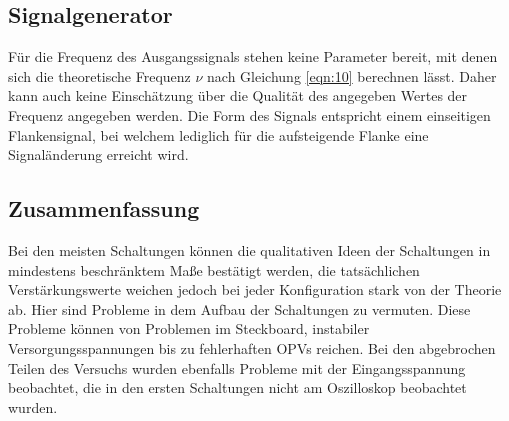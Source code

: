 \subsection{Signalgenerator}
Für die Frequenz des Ausgangssignals stehen keine Parameter bereit, mit denen sich die
theoretische Frequenz $\nu$ nach Gleichung \ref{eqn:10} berechnen lässt. Daher
kann auch keine Einschätzung über die Qualität des angegeben Wertes der Frequenz
angegeben werden. Die Form des Signals entspricht einem einseitigen Flankensignal,
bei welchem lediglich für die aufsteigende Flanke eine Signaländerung erreicht wird.

\subsection{Zusammenfassung}
Bei den meisten Schaltungen können die qualitativen Ideen der Schaltungen in mindestens beschränktem Maße bestätigt werden, die tatsächlichen Verstärkungswerte weichen jedoch bei jeder Konfiguration stark von der Theorie ab. Hier sind Probleme in dem Aufbau der Schaltungen zu vermuten.
Diese Probleme können von Problemen im Steckboard, instabiler Versorgungsspannungen bis zu fehlerhaften OPVs reichen. Bei den abgebrochen Teilen des Versuchs wurden ebenfalls Probleme mit der Eingangsspannung beobachtet, die in den ersten Schaltungen nicht am Oszilloskop beobachtet wurden.
